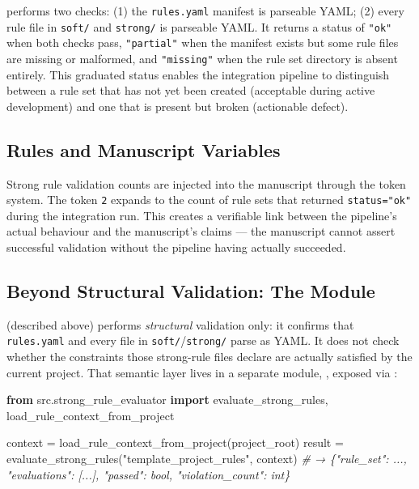 \documentclass[
]{article}
\newenvironment{Shaded}{}{}
\newcommand{\CommentTok}[1]{\textcolor[rgb]{0.38,0.63,0.69}{\textit{#1}}}
\newcommand{\ImportTok}[1]{\textcolor[rgb]{0.00,0.50,0.00}{\textbf{#1}}}
\newcommand{\NormalTok}[1]{#1}
\newcommand{\OperatorTok}[1]{\textcolor[rgb]{0.40,0.40,0.40}{#1}}
\newcommand{\StringTok}[1]{\textcolor[rgb]{0.25,0.44,0.63}{#1}}
\begin{document}
 performs two checks: (1) the
\texttt{rules.yaml} manifest is parseable YAML; (2) every rule file in
\texttt{soft/} and \texttt{strong/} is parseable YAML. It returns a
status of \texttt{"ok"} when both checks pass, \texttt{"partial"} when
the manifest exists but some rule files are missing or malformed, and
\texttt{"missing"} when the rule set directory is absent entirely. This
graduated status enables the integration pipeline to distinguish between
a rule set that has not yet been created (acceptable during active
development) and one that is present but broken (actionable defect).

\subsection{Rules and Manuscript
Variables}\label{rules-and-manuscript-variables}

Strong rule validation counts are injected into the manuscript through
the token system. The token \texttt{2} expands to the count of rule sets
that returned \texttt{status="ok"} during the integration run. This
creates a verifiable link between the pipeline's actual behaviour and
the manuscript's claims --- the manuscript cannot assert successful
validation without the pipeline having actually succeeded.

\subsection{\texorpdfstring{Beyond Structural Validation: The
Module}{Beyond Structural Validation: The strong_rule_evaluator Module}}\label{beyond-structural-validation-the-strong_rule_evaluator-module}

 (described above) performs
\emph{structural} validation only: it confirms that \texttt{rules.yaml}
and every file in \texttt{soft/}/\texttt{strong/} parse as YAML. It does
not check whether the constraints those strong-rule files declare are
actually satisfied by the current project. That semantic layer lives in
a separate module, , exposed via
:

\begin{Shaded}
\begin{Highlighting}[]
\ImportTok{from}\NormalTok{ src.strong\_rule\_evaluator }\ImportTok{import}\NormalTok{ evaluate\_strong\_rules, load\_rule\_context\_from\_project}

\NormalTok{context }\OperatorTok{=}\NormalTok{ load\_rule\_context\_from\_project(project\_root)}
\NormalTok{result }\OperatorTok{=}\NormalTok{ evaluate\_strong\_rules(}\StringTok{"template\_project\_rules"}\NormalTok{, context)}
\CommentTok{\# → \{"rule\_set": ..., "evaluations": [...], "passed": bool, "violation\_count": int\}}
\end{Highlighting}
\end{Shaded}
\end{document}
